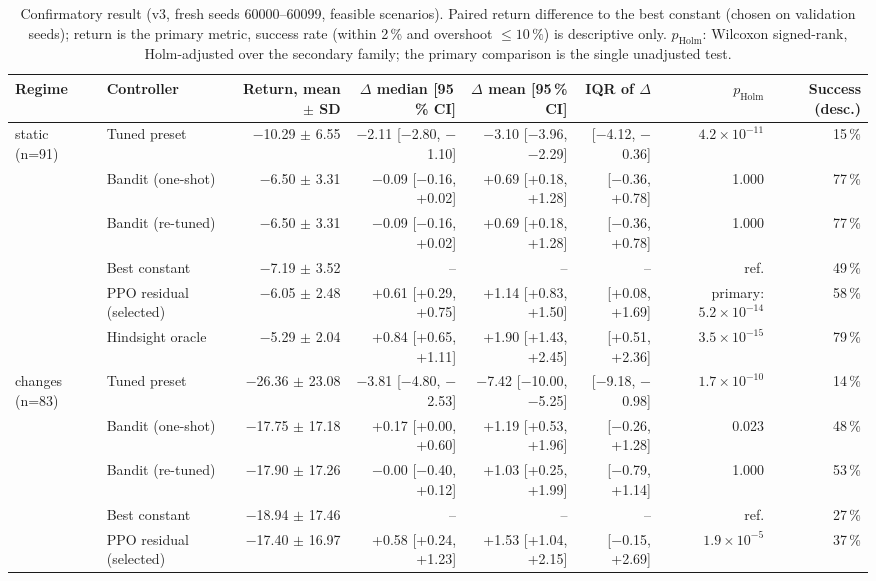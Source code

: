 \begin{table}[t]
\centering
\small
\caption{Confirmatory result (v3, fresh seeds 60000--60099, feasible scenarios). Paired return difference to the best constant (chosen on validation seeds); return is the primary metric, success rate (within 2\,\% and overshoot $\le10\,\%$) is descriptive only. $p_{\mathrm{Holm}}$: Wilcoxon signed-rank, Holm-adjusted over the secondary family; the primary comparison is the single unadjusted test.}
\label{tab:main_conf}
\begin{tabular}{llrrrrrr}
\toprule
Regime & Controller & Return, mean $\pm$ SD & $\Delta$ median [95\,\% CI] & $\Delta$ mean [95\,\% CI] & IQR of $\Delta$ & $p_{\mathrm{Holm}}$ & Success (desc.)\\
\midrule
static (n=91) & Tuned preset & $-$10.29 $\pm$ 6.55 & $-$2.11 [$-$2.80, $-$1.10] & $-$3.10 [$-$3.96, $-$2.29] & [$-$4.12, $-$0.36] & $4.2{\times}10^{-11}$ & 15\,\%\\
 & Bandit (one-shot) & $-$6.50 $\pm$ 3.31 & $-$0.09 [$-$0.16, +0.02] & +0.69 [+0.18, +1.28] & [$-$0.36, +0.78] & 1.000 & 77\,\%\\
 & Bandit (re-tuned) & $-$6.50 $\pm$ 3.31 & $-$0.09 [$-$0.16, +0.02] & +0.69 [+0.18, +1.28] & [$-$0.36, +0.78] & 1.000 & 77\,\%\\
 & Best constant & $-$7.19 $\pm$ 3.52 & -- & -- & -- & ref. & 49\,\%\\
 & PPO residual (selected) & $-$6.05 $\pm$ 2.48 & +0.61 [+0.29, +0.75] & +1.14 [+0.83, +1.50] & [+0.08, +1.69] & primary: $5.2{\times}10^{-14}$ & 58\,\%\\
 & Hindsight oracle & $-$5.29 $\pm$ 2.04 & +0.84 [+0.65, +1.11] & +1.90 [+1.43, +2.45] & [+0.51, +2.36] & $3.5{\times}10^{-15}$ & 79\,\%\\
\midrule
changes (n=83) & Tuned preset & $-$26.36 $\pm$ 23.08 & $-$3.81 [$-$4.80, $-$2.53] & $-$7.42 [$-$10.00, $-$5.25] & [$-$9.18, $-$0.98] & $1.7{\times}10^{-10}$ & 14\,\%\\
 & Bandit (one-shot) & $-$17.75 $\pm$ 17.18 & +0.17 [+0.00, +0.60] & +1.19 [+0.53, +1.96] & [$-$0.26, +1.28] & 0.023 & 48\,\%\\
 & Bandit (re-tuned) & $-$17.90 $\pm$ 17.26 & $-$0.00 [$-$0.40, +0.12] & +1.03 [+0.25, +1.99] & [$-$0.79, +1.14] & 1.000 & 53\,\%\\
 & Best constant & $-$18.94 $\pm$ 17.46 & -- & -- & -- & ref. & 27\,\%\\
 & PPO residual (selected) & $-$17.40 $\pm$ 16.97 & +0.58 [+0.24, +1.23] & +1.53 [+1.04, +2.15] & [$-$0.15, +2.69] & $1.9{\times}10^{-5}$ & 37\,\%\\

\end{tabular}
\end{table}
